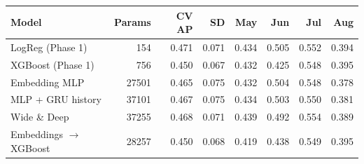 \begin{tabular}{lrrrrrrr}
\toprule
Model & Params & CV AP & SD & May & Jun & Jul & Aug \\
\midrule
LogReg (Phase 1) & 154 & 0.471 & 0.071 & 0.434 & 0.505 & 0.552 & 0.394 \\
XGBoost (Phase 1) & 756 & 0.450 & 0.067 & 0.432 & 0.425 & 0.548 & 0.395 \\
Embedding MLP & 27501 & 0.465 & 0.075 & 0.432 & 0.504 & 0.548 & 0.378 \\
MLP + GRU history & 37101 & 0.467 & 0.075 & 0.434 & 0.503 & 0.550 & 0.381 \\
Wide \& Deep & 37255 & 0.468 & 0.071 & 0.439 & 0.492 & 0.554 & 0.389 \\
Embeddings $\rightarrow$ XGBoost & 28257 & 0.450 & 0.068 & 0.419 & 0.438 & 0.549 & 0.395 \\
\bottomrule
\end{tabular}
